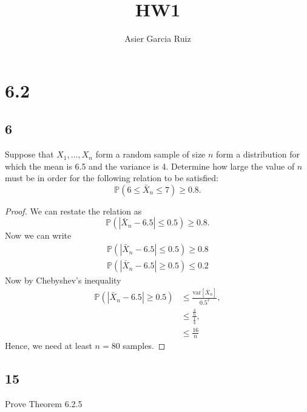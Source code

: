 \documentclass{article}
\title{HW1}
\author{Asier Garcia Ruiz}
\renewcommand{\P}[1]{\mathbb{P}\left(#1\right)}
\newcommand{\var}[1]{\text{var}\left[#1\right]}
\newcommand{\randsamp}{X_1,\dots,X_n}
\begin{document}
\maketitle

\section*{6.2}
\subsection*{6}
Suppose that $\randsamp$ form a random sample of size $n$ form a distribution for which the
mean is 6.5 and the variance is 4. Determine how large the value of $n$ must be in order
for the following relation to be satisfied:
\begin{equation*}
    \P{6 \leq \bar{X}_n \leq 7} \geq 0.8.
\end{equation*}

\begin{proof}
    We can restate the relation as
    \begin{equation*}
        \P{|\bar{X}_n - 6.5| \leq 0.5} \geq 0.8.
    \end{equation*}
    Now we can write
    \begin{gather*}
        \P{|\bar{X}_n - 6.5| \leq 0.5} \geq 0.8 \\
        \P{|\bar{X}_n - 6.5| \geq 0.5} \leq 0.2
    \end{gather*}
    Now by Chebyshev's inequality
    \begin{align*}
        \P{|\bar{X}_n - 6.5| \geq 0.5} & \leq \frac{\var{\bar{X}_n}}{0.5^2},   \\
                                       & \leq \frac{\frac{4}{n}}{\frac{1}{4}}, \\
                                       & \leq \frac{16}{n}
    \end{align*}
    Hence, we need at least $n = 80$ samples.
\end{proof}

\subsection*{15}
Prove Theorem 6.2.5
\end{document}

